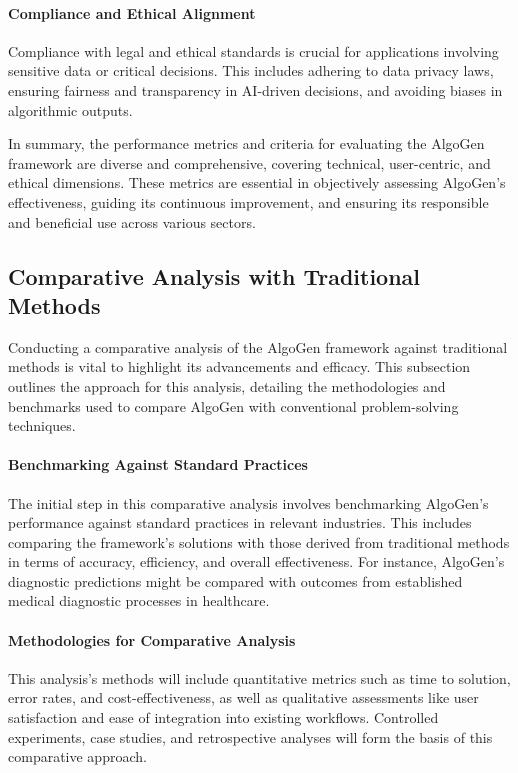 \documentclass{article}
\begin{document}
\paragraph{Compliance and Ethical Alignment}
Compliance with legal and ethical standards is crucial for applications involving sensitive data or critical decisions. This includes adhering to data privacy laws, ensuring fairness and transparency in AI-driven decisions, and avoiding biases in algorithmic outputs.

In summary, the performance metrics and criteria for evaluating the AlgoGen framework are diverse and comprehensive, covering technical, user-centric, and ethical dimensions. These metrics are essential in objectively assessing AlgoGen's effectiveness, guiding its continuous improvement, and ensuring its responsible and beneficial use across various sectors.



\subsection{Comparative Analysis with Traditional Methods}
Conducting a comparative analysis of the AlgoGen framework against traditional methods is vital to highlight its advancements and efficacy. This subsection outlines the approach for this analysis, detailing the methodologies and benchmarks used to compare AlgoGen with conventional problem-solving techniques.

\paragraph{Benchmarking Against Standard Practices}
The initial step in this comparative analysis involves benchmarking AlgoGen’s performance against standard practices in relevant industries. This includes comparing the framework's solutions with those derived from traditional methods in terms of accuracy, efficiency, and overall effectiveness. For instance, AlgoGen's diagnostic predictions might be compared with outcomes from established medical diagnostic processes in healthcare.

\paragraph{Methodologies for Comparative Analysis}
This analysis's methods will include quantitative metrics such as time to solution, error rates, and cost-effectiveness, as well as qualitative assessments like user satisfaction and ease of integration into existing workflows. Controlled experiments, case studies, and retrospective analyses will form the basis of this comparative approach.
\end{document}

